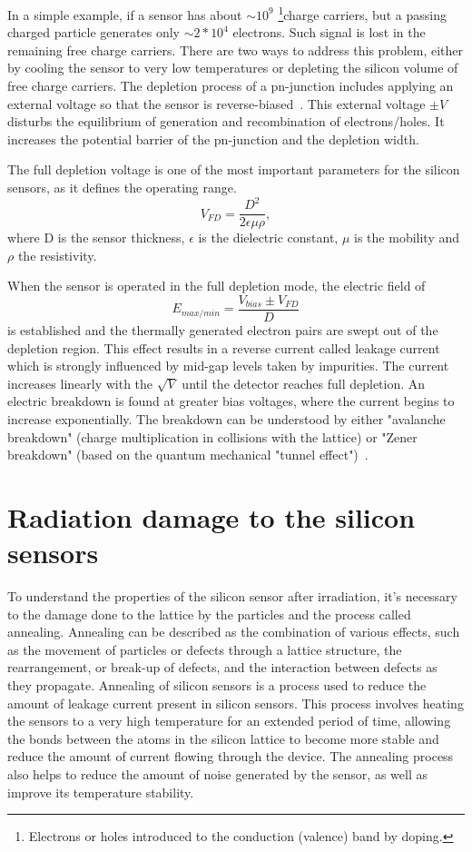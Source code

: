 In a simple example, if a sensor has about $\sim10^{9}$ \footnote{Electrons or holes introduced to the conduction (valence) band by doping.}{charge carriers}, but a passing charged particle generates only $\sim2*10^{4}$ electrons. Such signal is lost in the remaining free charge carriers. There are two ways to address this problem, either by cooling the sensor to very low temperatures or depleting the silicon volume of free charge carriers. The depletion process of a pn-junction includes applying an external voltage so that the sensor is reverse-biased~\cite{Spieler}. This external voltage $\pm V$ disturbs the equilibrium of generation and recombination of electrons/holes. It increases the potential barrier of the pn-junction and the depletion width. 

The full depletion voltage is one of the most important parameters for the silicon sensors, as it defines the operating range. 
\begin{equation}
    V_{FD} = \frac{D^{2}}{2\epsilon \mu \rho},
\end{equation}
where D is the sensor thickness, $\epsilon$ is the dielectric constant, $\mu$ is the mobility and $\rho$ the resistivity.

When the sensor is operated in the full depletion mode, the electric field of 
\begin{equation}
    E_{max/min} = \frac{V_{bias}\pm V_{FD}}{D}
\end{equation}
is established and the thermally generated electron pairs are swept out of the depletion region. This effect results in a reverse current called leakage current which is strongly influenced by mid-gap levels taken by impurities. The current increases linearly with the $\sqrt{V}$ until the detector reaches full depletion. An electric breakdown is found at greater bias voltages, where the current begins to increase exponentially. The breakdown can be understood by either "avalanche breakdown" (charge multiplication in collisions with the lattice) or "Zener breakdown" (based on the quantum mechanical "tunnel effect")~\cite{Hartmann:2017gzy}.

\section{Radiation damage to the silicon sensors} 
To understand the properties of the silicon sensor after irradiation, it's necessary to the damage done to the lattice by the particles and the process called annealing. Annealing can be described as the combination of various effects, such as the movement of particles or defects through a lattice structure, the rearrangement, or break-up of defects, and the interaction between defects as they propagate. Annealing of silicon sensors is a process used to reduce the amount of leakage current present in silicon sensors. This process involves heating the sensors to a very high temperature for an extended period of time, allowing the bonds between the atoms in the silicon lattice to become more stable and reduce the amount of current flowing through the device. The annealing process also helps to reduce the amount of noise generated by the sensor, as well as improve its temperature stability. 

